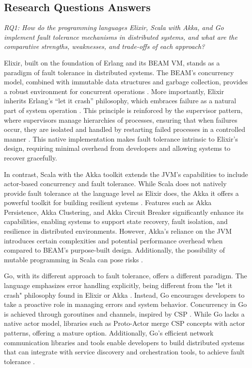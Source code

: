 \subsection{Research Questions Answers}

\textit{RQ1: How do the programming languages Elixir, Scala with Akka, and Go implement fault tolerance mechanisms in distributed systems, and what are the comparative strengths, weaknesses, and trade-offs of each approach?}

Elixir, built on the foundation of Erlang and its \gls{BEAM} \gls{VM}, stands as a paradigm of fault tolerance in distributed systems. The \gls{BEAM}'s concurrency model, combined with immutable data structures and garbage collection, provides a robust environment for concurrent operations \cite{Juric2024}. More importantly, Elixir inherits Erlang’s “let it crash” philosophy, which embraces failure as a natural part of system operation \cite{Armstrong2013}. This principle is reinforced by the supervisor pattern, where supervisors manage hierarchies of processes, ensuring that when failures occur, they are isolated and handled by restarting failed processes in a controlled manner \cite{Juric2024}. This native implementation makes fault tolerance intrinsic to Elixir’s design, requiring minimal overhead from developers and allowing systems to recover gracefully.

In contrast, Scala with the Akka toolkit extends the JVM’s capabilities to include actor-based concurrency and fault tolerance. While Scala does not natively provide fault tolerance at the language level as Elixir does, the Akka it offers a powerful toolkit for building resilient systems \cite{akka-docs,Abraham2023}. Features such as Akka Persistence, Akka Clustering, and Akka Circuit Breaker significantly enhance its capabilities, enabling systems to support state recovery, fault isolation, and resilience in distributed environments. However, Akka’s reliance on the JVM introduces certain complexities and potential performance overhead when compared to BEAM’s purpose-built design. Additionally, the possibility of mutable programming in Scala can pose risks \cite{akka-docs}.

Go, with its different approach to fault tolerance, offers a different paradigm. The language emphasizes error handling explicitly, being different from the "let it crash" philosophy found in Elixir or Akka \cite{go-docs}. Instead, Go encourages developers to take a proactive role in managing errors and system behavior. Concurrency in Go is achieved through goroutines and channels, inspired by \gls{CSP} \cite{proto-actor-docs}. While Go lacks a native actor model, libraries such as Proto-Actor merge CSP concepts with actor patterns, offering a mature option. Additionally, Go’s efficient network communication libraries and tools enable developers to build distributed systems that can integrate with service discovery and orchestration tools, to achieve fault tolerance \cite{Shuiskov2022}.

